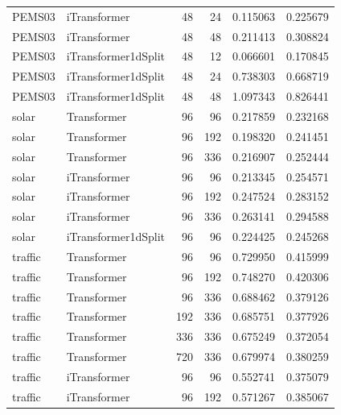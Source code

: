 \documentclass[stu,12pt,floatsintext]{apa7}
\begin{document}
\begin{longtable}{llrrrr}
      PEMS03 &        iTransformer &            48 &             24 & 0.115063 & 0.225679 \\
      PEMS03 &        iTransformer &            48 &             48 & 0.211413 & 0.308824 \\
      PEMS03 & iTransformer1dSplit &            48 &             12 & 0.066601 & 0.170845 \\
      PEMS03 & iTransformer1dSplit &            48 &             24 & 0.738303 & 0.668719 \\
      PEMS03 & iTransformer1dSplit &            48 &             48 & 1.097343 & 0.826441 \\
       solar &         Transformer &            96 &             96 & 0.217859 & 0.232168 \\
       solar &         Transformer &            96 &            192 & 0.198320 & 0.241451 \\
       solar &         Transformer &            96 &            336 & 0.216907 & 0.252444 \\
       solar &        iTransformer &            96 &             96 & 0.213345 & 0.254571 \\
       solar &        iTransformer &            96 &            192 & 0.247524 & 0.283152 \\
       solar &        iTransformer &            96 &            336 & 0.263141 & 0.294588 \\
       solar & iTransformer1dSplit &            96 &             96 & 0.224425 & 0.245268 \\
     traffic &         Transformer &            96 &             96 & 0.729950 & 0.415999 \\
     traffic &         Transformer &            96 &            192 & 0.748270 & 0.420306 \\
     traffic &         Transformer &            96 &            336 & 0.688462 & 0.379126 \\
     traffic &         Transformer &           192 &            336 & 0.685751 & 0.377926 \\
     traffic &         Transformer &           336 &            336 & 0.675249 & 0.372054 \\
     traffic &         Transformer &           720 &            336 & 0.679974 & 0.380259 \\
     traffic &        iTransformer &            96 &             96 & 0.552741 & 0.375079 \\
     traffic &        iTransformer &            96 &            192 & 0.571267 & 0.385067 \\

\end{longtable}
\end{document}
